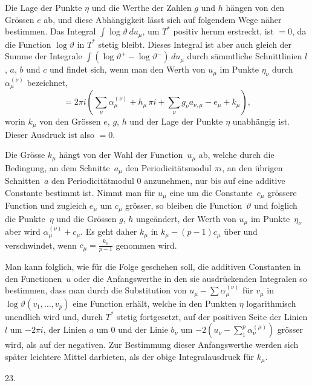 \documentclass[a4paper,12pt,leqno]{article}
\begin{document}
Die Lage der Punkte $\eta$ und die Werthe der Zahlen $g$ und $h$
h\"{a}ngen von den Gr\"{o}ssen $e$ ab, und diese Abh\"{a}ngigkeit
l\"{a}sst sich auf folgendem Wege n\"{a}her bestimmen.  Das
Integral
$\int \log \vartheta \, du_\mu$, um $T^*$
positiv herum erstreckt, ist $= 0$, da die Function
$\log \vartheta$ in $T^*$ stetig bleibt.  Dieses Integral ist
aber auch gleich der Summe der Integrale
$\int ( \log \vartheta^+ - \log \vartheta^-) \, du_\mu$
durch s\"{a}mmtliche Schnittlinien $l$, $a$, $b$ und $c$ und
findet sich, wenn man den Werth von $u_\mu$ im Punkte $\eta_\nu$
durch $\alpha_\mu^{(\nu)}$ bezeichnet,
\[ = 2 \pi i \left( \sum_\nu \alpha_\mu^{(\nu)}
      + h_\mu \, \pi i
      + \sum_\nu g_\nu a_{\nu, \mu}
      - e_\mu + k_\mu \right),\]
worin $k_\mu$ von den Gr\"{o}ssen $e$, $g$, $h$ und der Lage der
Punkte $\eta$ unabh\"{a}ngig ist.  Dieser Ausdruck ist also
$= 0$.

Die Gr\"{o}sse $k_\mu$ h\"{a}ngt von der Wahl der
Function~$u_\mu$ ab, welche durch die Bedingung, an dem
Schnitte~$a_\mu$ den Periodicit\"{a}tsmodul $\pi i$, an den
\"{u}brigen Schnitten~$a$ den Periodicit\"{a}tmodul $0$
anzunehmen, nur bis auf eine additive Constante bestimmt ist.
Nimmt man f\"{u}r $u_\mu$ eine um die Constante~$c_\mu$
gr\"{o}ssere Function und zugleich $e_\mu$ um $c_\mu$
gr\"{o}sser, so bleiben die Function~$\vartheta$ und folglich die
Punkte~$\eta$ und die Gr\"{o}ssen $g$, $h$ unge\"{a}ndert, der
Werth von $u_\mu$ im Punkte~$\eta_\nu$ aber wird
$\alpha_\mu^{(\nu)} + c_\mu$.  Es geht daher $k_\mu$ in
$k_\mu - (p - 1) c_\mu$ \"{u}ber und verschwindet, wenn
$\displaystyle c_\mu = \frac{k_\mu}{p - 1}$ genommen wird.

Man kann folglich, wie f\"{u}r die Folge geschehen soll, die
additiven Constanten in den Functionen~$u$ oder die Anfangswerthe
in den sie ausdr\"{u}ckenden Integralen so bestimmen, dass man
durch die Substitution von $u_\mu - \sum \alpha_\mu^{(\nu)}$ f\"{u}r
$v_\mu$ in $\log \vartheta (v_1,\ldots, v_p)$ eine Function erh\"{a}lt,
welche in den Punkten $\eta$ logarithmisch unendlich wird und,
durch $T^*$ stetig fortgesetzt, auf der positiven Seite der
Linien $l$ um $- 2 \pi i$, der Linien $a$ um $0$ und der Linie
$b_\nu$ um
$-2 ( u_\nu - \sum\limits_1^p \alpha_\nu^{(\mu)} )$
gr\"{o}sser wird, als auf der negativen.  Zur Bestimmung dieser
Anfangswerthe werden sich sp\"{a}ter leichtere Mittel darbieten,
als der obige Integralausdruck f\"{u}r $k_\mu$.

\medbreak

\centerline{23.}
\end{document}
